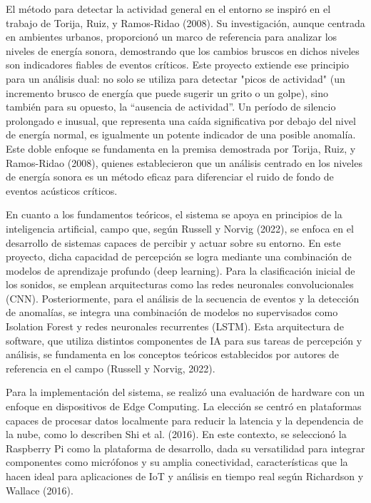 El método para detectar la actividad general en el entorno se inspiró en el trabajo de Torija, Ruiz, y Ramos-Ridao (2008). Su investigación, aunque centrada en ambientes urbanos, proporcionó un marco de referencia para analizar los niveles de energía sonora, demostrando que los cambios bruscos en dichos niveles son indicadores fiables de eventos críticos. Este proyecto extiende ese principio para un análisis dual: no solo se utiliza para detectar "picos de actividad" (un incremento brusco de energía que puede sugerir un grito o un golpe), sino también para su opuesto, la ``ausencia de actividad''. Un período de silencio prolongado e inusual, que representa una caída significativa por debajo del nivel de energía normal, es igualmente un potente indicador de una posible anomalía. Este doble enfoque se fundamenta en la premisa demostrada por Torija, Ruiz, y Ramos-Ridao (2008), quienes establecieron que un análisis centrado en los niveles de energía sonora es un método eficaz para diferenciar el ruido de fondo de eventos acústicos críticos.

En cuanto a los fundamentos teóricos, el sistema se apoya en principios de la inteligencia artificial, campo que, según Russell y Norvig (2022), se enfoca en el desarrollo de sistemas capaces de percibir y actuar sobre su entorno. En este proyecto, dicha capacidad de percepción se logra mediante una combinación de modelos de aprendizaje profundo (deep learning). Para la clasificación inicial de los sonidos, se emplean arquitecturas como las redes neuronales convolucionales (CNN). Posteriormente, para el análisis de la secuencia de eventos y la detección de anomalías, se integra una combinación de modelos no supervisados como Isolation Forest y redes neuronales recurrentes (LSTM). Esta arquitectura de software, que utiliza distintos componentes de IA para sus tareas de percepción y análisis, se fundamenta en los conceptos teóricos establecidos por autores de referencia en el campo (Russell y Norvig, 2022).


Para la implementación del sistema, se realizó una evaluación de hardware con un enfoque en dispositivos de Edge Computing. La elección se centró en plataformas capaces de procesar datos localmente para reducir la latencia y la dependencia de la nube, como lo describen Shi et al. (2016). En este contexto, se seleccionó la Raspberry Pi como la plataforma de desarrollo, dada su versatilidad para integrar componentes como micrófonos y su amplia conectividad, características que la hacen ideal para aplicaciones de IoT y análisis en tiempo real según Richardson y Wallace (2016).

